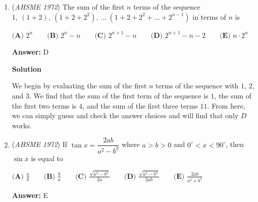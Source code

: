\begin{enumerate}
 The bases of a trapezoid are parallel by definition, so $\angle EDC$ and $\angle EBA$ are alternate interior angles, and therefore equal. We have the same setup with $\angle ECD$ and $\angle EAB$, meaning that $\triangle ABE \sim \triangle CDE$ by AA Similarity. We could've also used the fact that $\angle BEA$ and $\angle DEC$ are vertical angles.

 With this information, we can setup a ratio of corresponding sides:
 \[\frac{AB}{CD} = \frac{AE}{CE} \implies \frac{2CD}{CD} = \frac{11 - CE}{CE}.\]And simplify from there:
 \begin{align*} \frac{2CD}{CD} &= \frac{11 - CE}{CE} \\ 2 &= \frac{11 - CE}{CE} \\ 2CE &= 11 - CE \\ 3CE &= 11 \\ CE &= \frac{11}{3} = 3 \frac{2}{3}. \end{align*}
Therefore, our answer is $\boxed{\textbf{(A) }3\textstyle\frac{2}{3}.}$



	\item (\textit{AHSME 1972}) The sum of the first $n$ terms of the sequence $1,~(1+2),~(1+2+2^2),~\dots ~(1+2+2^2+\dots +2^{n-1})$ in terms of $n$ is


 $\textbf{(A) }2^n\qquad \textbf{(B) }2^n-n\qquad \textbf{(C) }2^{n+1}-n\qquad \textbf{(D) }2^{n+1}-n-2\qquad  \textbf{(E) }n\cdot 2^n$

 \textbf{Answer: }D



\textbf{Solution}

We begin by evaluating the sum of the first $n$ terms of the sequence with $1$, $2$, and $3$. We find that the sum of the first term of the sequence is $1$, the sum of the first two terms is $4$, and the sum of the first three terms $11$. From here, we can simply guess and check the answer choices and will find that only $\boxed{D}$ works.

 


	\item (\textit{AHSME 1972}) If $\tan x=\dfrac{2ab}{a^2-b^2}$ where $a>b>0$ and $0^\circ <x<90^\circ$, then $\sin x$ is equal to


 $\textbf{(A) }\frac{a}{b}\qquad \textbf{(B) }\frac{b}{a}\qquad \textbf{(C) }\frac{\sqrt{a^2-b^2}}{2a}\qquad \textbf{(D) }\frac{\sqrt{a^2-b^2}}{2ab}\qquad \textbf{(E) }\frac{2ab}{a^2+b^2}$

 \textbf{Answer: }E




\end{enumerate}
